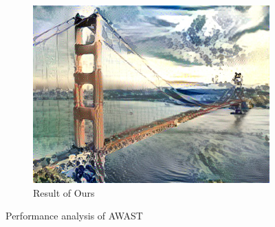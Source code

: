 \documentclass[10pt,twocolumn,letterpaper]{article}
\begin{document}
\begin{figure}[!h]
\begin{subfigure}[b]{0.33\textwidth}
    \includegraphics[width=\textwidth]{figure/ourgoldbridge.jpg}
    \caption{Result of Ours}
    \label{fig::goldours}
  \end{subfigure}
  \caption{Performance analysis of AWAST}
  \label{fig::goldbridge}
\end{figure}
\end{document}
